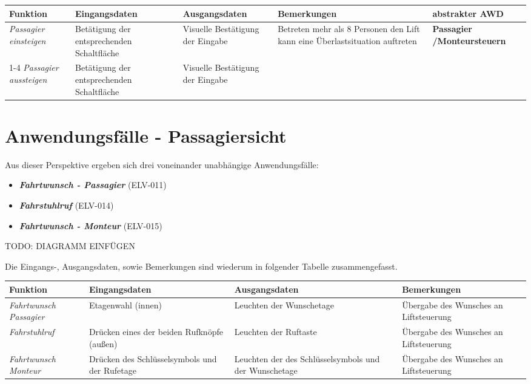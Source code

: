  {
\vspace{1cm}
\hspace{-0,5cm}
\footnotesize
\begin{tabular}{|p{}|p{}|p{}|p{}|p{2cm}|}
	\hline
		\textbf{Funktion} &
		\textbf{Eingangsdaten} &
		\textbf{Ausgangsdaten} &
		\textbf{Bemerkungen} &
		\textbf{abstrakter AWD} \\
	\hline \hline
		\textit{Passagier \newline einsteigen} &
		Betätigung der entsprechenden Schaltfläche &
		Visuelle Bestätigung der Eingabe &
		Betreten mehr als 8 Personen den Lift kann eine Überlastsituation auftreten&
		\textbf{Passagier /\newline Monteur\newline steuern} \\
	\cline{1-4}
		\textit{Passagier \newline aussteigen} &
		Betätigung der entsprechenden Schaltfläche &
		Visuelle Bestätigung der Eingabe &
		&
		\\
	\hline
\end{tabular}
}

\section{Anwendungsfälle - Passagiersicht}
Aus dieser Perspektive ergeben sich drei voneinander unabhängige Anwendungsfälle:

\begin{itemize}
	\item \textit{\textbf{Fahrtwunsch - Passagier}} (ELV-011)
	\item \textit{\textbf{Fahrstuhlruf }} (ELV-014)
	\item \textit{\textbf{Fahrtwunsch - Monteur }} (ELV-015)
\end{itemize}

TODO: DIAGRAMM EINFÜGEN

Die Eingangs-, Ausgangsdaten, sowie Bemerkungen sind wiederum in folgender Tabelle zusammengefasst.

 {
\vspace{1cm}
\hspace{-0,5cm}
\footnotesize
\begin{tabular}{|p{2cm}|p{3cm}|p{3cm}|p{3cm}|}
	\hline
		\textbf{Funktion} &
		\textbf{Eingangsdaten} &
		\textbf{Ausgangsdaten} &
		\textbf{Bemerkungen} \\
	\hline \hline
		\textit{Fahrtwunsch \newline Passagier} &
		Etagenwahl (innen) &
		Leuchten der Wunschetage &
		Übergabe des Wunsches an Liftsteuerung \\
	\hline
		\textit{Fahrstuhlruf} &
		Drücken eines der beiden Rufknöpfe (außen) &
		Leuchten der Ruftaste &
		Übergabe des Wunsches an Liftsteuerung  \\
	\hline
		\textit{Fahrtwunsch \newline Monteur} &
		Drücken des Schlüsselsymbols und der Rufetage &
		Leuchten der des Schlüsselsymbols und der Wunschetage &
		Übergabe des Wunsches an Liftsteuerung  \\
	\hline
\end{tabular}
}


